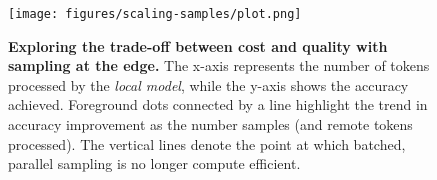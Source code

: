 


\begin{figure}[t]
    \centering
    \texttt{[image: figures/scaling-samples/plot.png]}
    \caption{\textbf{Exploring the trade-off between cost and quality with sampling at the edge.} The x-axis represents the number of tokens processed by the \textit{local model}, while the y-axis shows the accuracy achieved. Foreground dots connected by a line highlight the trend in accuracy improvement as the number samples (and remote tokens processed). The vertical  lines denote the point at which batched, parallel sampling is no longer compute efficient.}
    \label{fig:scaling-samples}
\end{figure}
